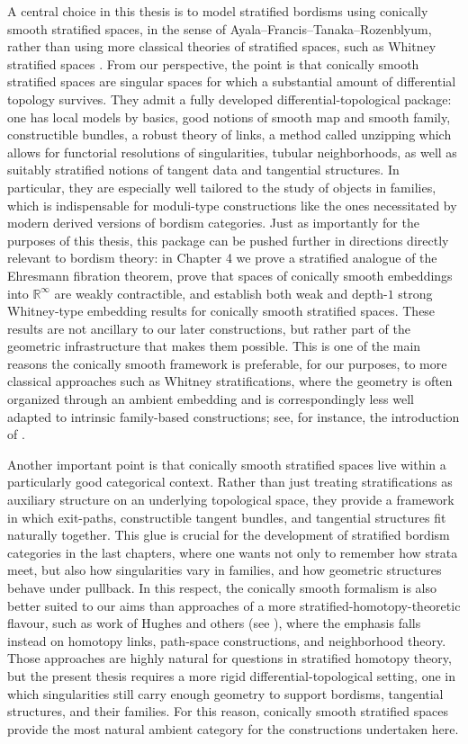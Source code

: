 A central choice in this thesis is to model stratified bordisms using conically smooth stratified spaces, in the sense of Ayala--Francis--Tanaka--Rozenblyum, rather than using more classical theories of stratified spaces, such as Whitney stratified spaces \cite{M12,Tro20}. From our perspective, the point is that conically smooth stratified spaces are singular spaces for which a substantial amount of differential topology survives. They admit a fully developed differential-topological package: one has local models by basics, good notions of smooth map and smooth family, constructible bundles, a robust theory of links, a method called unzipping which allows for functorial resolutions of singularities, tubular neighborhoods, as well as suitably stratified notions of tangent data and tangential structures. In particular, they are especially well tailored to the study of objects in families, which is indispensable for moduli-type constructions like the ones necessitated by modern derived versions of bordism categories. Just as importantly for the purposes of this thesis, this package can be pushed further in directions directly relevant to bordism theory: in Chapter 4 we prove a stratified analogue of the Ehresmann fibration theorem, prove that spaces of conically smooth embeddings into $\mathbb{R}^{\infty}$ are weakly contractible, and establish both weak and depth-$1$ strong Whitney-type embedding results for conically smooth stratified spaces. These results are not ancillary to our later constructions, but rather part of the geometric infrastructure that makes them possible. This is one of the main reasons the conically smooth framework is preferable, for our purposes, to more classical approaches such as Whitney stratifications, where the geometry is often organized through an ambient embedding and is correspondingly less well adapted to intrinsic family-based constructions; see, for instance, the introduction of \cite{AFT1,AFR1}.

Another important point is that conically smooth stratified spaces live within a particularly good categorical context. Rather than just treating stratifications as auxiliary structure on an underlying topological space, they provide a framework in which exit-paths, constructible tangent bundles, and tangential structures fit naturally together. This glue is crucial for the development of stratified bordism categories in the last chapters, where one wants not only to remember how strata meet, but also how singularities vary in families, and how geometric structures behave under pullback. In this respect, the conically smooth formalism is also better suited to our aims than approaches of a more stratified-homotopy-theoretic flavour, such as work of Hughes and others (see \cite{Hu99}), where the emphasis falls instead on homotopy links, path-space constructions, and neighborhood theory. Those approaches are highly natural for questions in stratified homotopy theory, but the present thesis requires a more rigid differential-topological setting, one in which singularities still carry enough geometry to support bordisms, tangential structures, and their families. For this reason, conically smooth stratified spaces provide the most natural ambient category for the constructions undertaken here.


